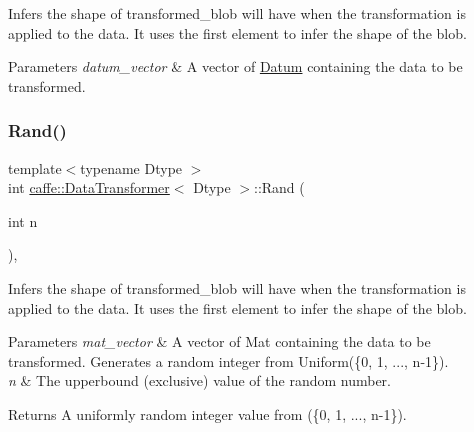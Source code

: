 Infers the shape of transformed\+\_\+blob will have when the transformation is applied to the data. It uses the first element to infer the shape of the blob. 


\begin{DoxyParams}{Parameters}
{\em datum\+\_\+vector} & A vector of \mbox{\hyperlink{classcaffe_1_1_datum}{Datum}} containing the data to be transformed. \\
\hline
\end{DoxyParams}
\mbox{\label{classcaffe_1_1_data_transformer_ac3e52731074a73b05ff0527d2febc8f2}} 
\subsubsection{\texorpdfstring{Rand()}{Rand()}\hspace{0.1cm}{\footnotesize\ttfamily [1/2]}}
{\footnotesize\ttfamily template$<$typename Dtype $>$ \\
int \mbox{\hyperlink{classcaffe_1_1_data_transformer}{caffe\+::\+Data\+Transformer}}$<$ Dtype $>$\+::Rand (\begin{DoxyParamCaption}\item[{int}]{n }\end{DoxyParamCaption})\hspace{0.3cm}{\ttfamily [protected]}, {\ttfamily [virtual]}}



Infers the shape of transformed\+\_\+blob will have when the transformation is applied to the data. It uses the first element to infer the shape of the blob. 


\begin{DoxyParams}{Parameters}
{\em mat\+\_\+vector} & A vector of Mat containing the data to be transformed. Generates a random integer from Uniform(\{0, 1, ..., n-\/1\}).\\
\hline
{\em n} & The upperbound (exclusive) value of the random number. \\
\hline
\end{DoxyParams}
\begin{DoxyReturn}{Returns}
A uniformly random integer value from (\{0, 1, ..., n-\/1\}). 
\end{DoxyReturn}
\mbox{\label{classcaffe_1_1_data_transformer_a8a1c9f19fc142e8d3bd1c4e2814975c2}} 
